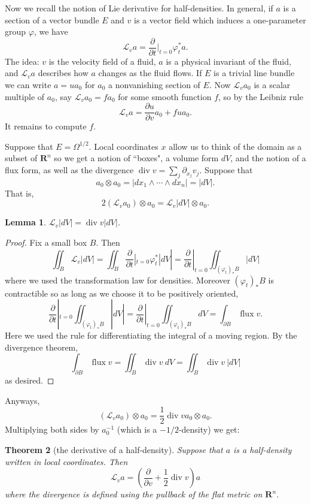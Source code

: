 \documentclass[reqno,12pt,letterpaper]{amsart}
\newcommand{\RR}{\mathbf{R}}
\newtheorem{theorem}{Theorem}[section]
\newtheorem{lemma}[theorem]{Lemma}
\theoremstyle{definition}
\begin{document}
Now we recall the notion of Lie derivative for half-densities.
In general, if $a$ is a section of a vector bundle $E$ and $v$ is a vector field which induces a one-parameter group $\varphi$, we have
$$\mathcal L_va = \frac{\partial}{\partial t}|_{t = 0} \varphi_t^* a.$$
The idea: $v$ is the velocity field of a fluid, $a$ is a physical invariant of the fluid, and $\mathcal L_va$ describes how $a$ changes as the fluid flows.
If $E$ is a trivial line bundle we can write $a = ua_0$ for $a_0$ a nonvanishing section of $E$.
Now $\mathcal L_va_0$ is a scalar multiple of $a_0$, say $\mathcal L_va_0 = fa_0$ for some smooth function $f$, so by the Leibniz rule
$$\mathcal L_va = \frac{\partial u}{\partial v} a_0 + fua_0.$$
It remains to compute $f$.

Suppose that $E = \Omega^{1/2}$.
Local coordinates $x$ allow us to think of the domain as a subset of $\RR^n$ so we get a notion of ``boxes", a volume form $dV$, and the notion of a flux form, as well as the divergence $\operatorname{div} v = \sum_j \partial_{x_j} v_j$.
Suppose that
$$a_0 \otimes a_0 = |dx_1 \wedge \cdots \wedge dx_n| = |dV|.$$
That is,
$$2(\mathcal L_va_0) \otimes a_0 = \mathcal L_v|dV| \otimes a_0.$$

\begin{lemma}
$\mathcal L_v|dV| = \operatorname{div} v |dV|$.
\end{lemma}
\begin{proof}
Fix a small box $B$.
Then
$$\iint_B \mathcal L_v |dV| = \iint_B \frac{\partial}{\partial t}|_{t = 0} \varphi_t^* |dV| = \frac{\partial}{\partial t}|_{t = 0} \iint_{(\varphi_t)_* B} |dV|$$
where we used the transformation law for densities.
Moreover $(\varphi_t)_*B$ is contractible so as long as we choose it to be positively oriented,
$$\frac{\partial}{\partial t}|_{t = 0} \iint_{(\varphi_t)_* B} |dV| = \frac{\partial}{\partial t}|_{t = 0} \iint_{(\varphi_t)_* B} dV = \int_{\partial B} \operatorname{flux} v.$$
Here we used the rule for differentiating the integral of a moving region.
By the divergence theorem,
$$\int_{\partial B} \operatorname{flux} v = \iint_B \operatorname{div} v ~dV = \iint_B \operatorname{div} v ~|dV|$$
as desired.
\end{proof}

Anyways,
$$(\mathcal L_va_0) \otimes a_0 = \frac{1}{2} \operatorname{div} v a_0 \otimes a_0.$$
Multiplying both sides by $a_0^{-1}$ (which is a $-1/2$-density) we get:

\begin{theorem}[the derivative of a half-density]
Suppose that $a$ is a half-density written in local coordinates. Then
$$\mathcal L_v a = \left(\frac{\partial}{\partial v} + \frac{1}{2}\operatorname{div} v\right)a$$
where the divergence is defined using the pullback of the flat metric on $\RR^n$.
\end{theorem}
\end{document}
